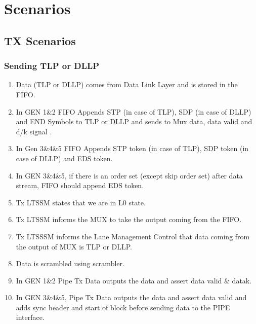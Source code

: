 \chapter{Scenarios}
\section{TX Scenarios}
\subsection{Sending TLP or DLLP}
\begin{enumerate}
\item Data (TLP or DLLP) comes from Data Link Layer and is stored in the FIFO.
\item In GEN 1\&2 FIFO Appends STP (in case of TLP), SDP (in case of DLLP) and END Symbols to TLP or DLLP and sends to Mux data, data valid and d/k signal .
\item In Gen 3\&4\&5 FIFO Appends STP token (in case of TLP), SDP token (in case of DLLP) and EDS token. 
\item In GEN 3\&4\&5, if there is an order set (except skip order set) after data stream, FIFO should append EDS token. 
\item Tx LTSSM states that we are in L0 state.
\item Tx LTSSM informs the MUX to take the output coming from the FIFO.
\item Tx LTSSSM informs the Lane Management Control that data coming from the output of MUX is TLP or DLLP.
\item Data is scrambled using scrambler.
\item In GEN 1\&2 Pipe Tx Data outputs the data and assert data valid \& datak. 
\item In GEN 3\&4\&5, Pipe Tx Data outputs the data and assert data valid and adds sync header and start of block before sending data to the PIPE interface.
\end{enumerate}
